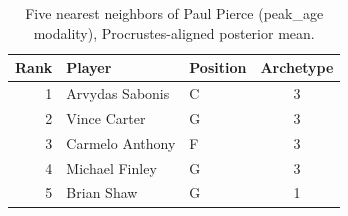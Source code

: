 \begin{table}[htbp]
  \centering\small
  \begin{tabular}{rllc}
    \toprule
    Rank & Player & Position & Archetype \\
    \midrule
    1 & Arvydas Sabonis & C & 3 \\
    2 & Vince Carter & G & 3 \\
    3 & Carmelo Anthony & F & 3 \\
    4 & Michael Finley & G & 3 \\
    5 & Brian Shaw & G & 1 \\
    \bottomrule
  \end{tabular}
  \caption{Five nearest neighbors of Paul Pierce (peak_age modality), Procrustes-aligned posterior mean.}
  \label{tab:Paul_Pierce_neighbors_peak_age}
\end{table}

